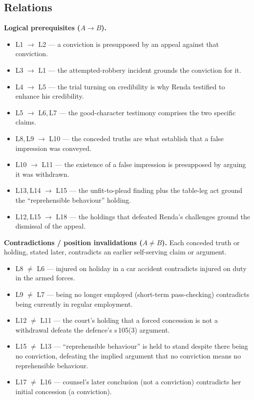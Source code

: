 \documentclass[11pt]{article}
\begin{document}
\subsection*{Relations}

\textbf{Logical prerequisites ($A \rightarrow B$).}
\begin{itemize}[leftmargin=*]
  \item L1 $\rightarrow$ L2 --- a conviction is presupposed by an appeal against that conviction.
  \item L3 $\rightarrow$ L1 --- the attempted-robbery incident grounds the conviction for it.
  \item L4 $\rightarrow$ L5 --- the trial turning on credibility is why Renda testified to enhance his credibility.
  \item L5 $\rightarrow$ L6,\,L7 --- the good-character testimony comprises the two specific claims.
  \item L8,\,L9 $\rightarrow$ L10 --- the conceded truths are what establish that a false impression was conveyed.
  \item L10 $\rightarrow$ L11 --- the existence of a false impression is presupposed by arguing it was withdrawn.
  \item L13,\,L14 $\rightarrow$ L15 --- the unfit-to-plead finding plus the table-leg act ground the ``reprehensible behaviour'' holding.
  \item L12,\,L15 $\rightarrow$ L18 --- the holdings that defeated Renda's challenges ground the dismissal of the appeal.
\end{itemize}

\noindent
\textbf{Contradictions / position invalidations ($A \neq B$).} Each conceded
truth or holding, stated later, contradicts an earlier self-serving claim or
argument.
\begin{itemize}[leftmargin=*]
  \item L8 $\neq$ L6 --- injured on holiday in a car accident contradicts injured on duty in the armed forces.
  \item L9 $\neq$ L7 --- being no longer employed (short-term pass-checking) contradicts being currently in regular employment.
  \item L12 $\neq$ L11 --- the court's holding that a forced concession is not a withdrawal defeats the defence's s\,105(3) argument.
  \item L15 $\neq$ L13 --- ``reprehensible behaviour'' is held to stand despite there being no conviction, defeating the implied argument that no conviction means no reprehensible behaviour.
  \item L17 $\neq$ L16 --- counsel's later conclusion (not a conviction) contradicts her initial concession (a conviction).
\end{itemize}
\end{document}
